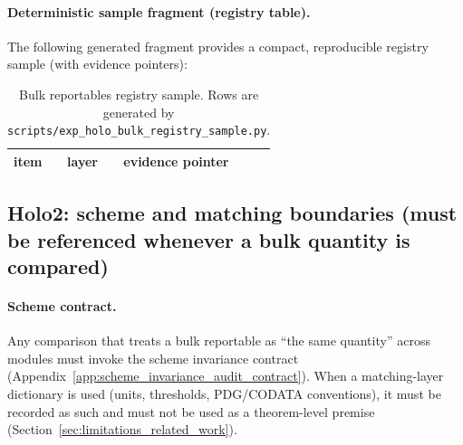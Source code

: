 \paragraph{Deterministic sample fragment (registry table).}
\AuditTag The following generated fragment provides a compact, reproducible registry sample (with evidence pointers):
\begin{table}[H]
\centering
\scriptsize
\setlength{\tabcolsep}{6pt}
\renewcommand{\arraystretch}{1.15}
\begin{tabular}{p{} p{} p{}}
\toprule
item & layer & evidence pointer \\
\midrule
%
\end{tabular}
\caption{Bulk reportables registry sample. Rows are generated by \texttt{scripts/exp\_holo\_bulk\_registry\_sample.py}.}
\label{tab:holo_bulk_registry_sample}
\end{table}
%

\subsection{Holo2: scheme and matching boundaries (must be referenced whenever a bulk quantity is compared)}
\label{subsec:holo2_scheme_boundaries}

\paragraph{Scheme contract.}
\AuditTag Any comparison that treats a bulk reportable as ``the same quantity'' across modules must invoke the scheme
invariance contract (Appendix~\ref{app:scheme_invariance_audit_contract}).
When a matching-layer dictionary is used (units, thresholds, PDG/CODATA conventions), it must be recorded as such and
must not be used as a theorem-level premise (Section~\ref{sec:limitations_related_work}).

